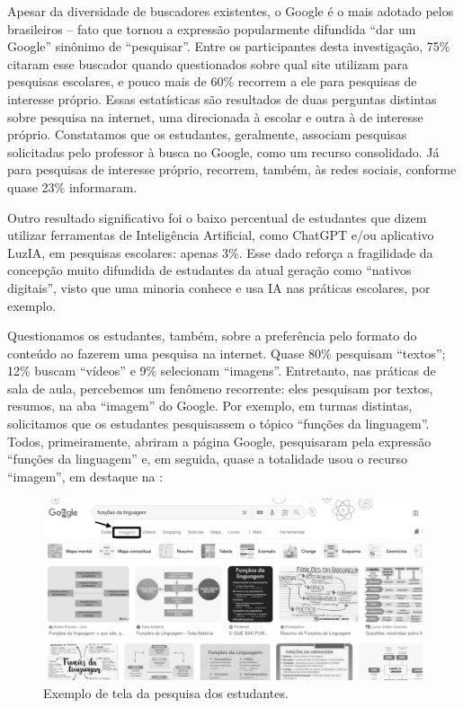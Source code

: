 \documentclass[portuguese]{textolivre}
\begin{document}
Apesar da diversidade de buscadores existentes, o Google é o mais adotado pelos brasileiros – fato que tornou a expressão popularmente difundida ``dar um Google'' sinônimo de ``pesquisar''. Entre os participantes desta investigação, 75\% citaram esse buscador quando questionados sobre qual site utilizam para pesquisas escolares, e pouco mais de 60\% recorrem a ele para pesquisas de interesse próprio. Essas estatísticas são resultados de duas perguntas distintas sobre pesquisa na internet, uma direcionada à escolar e outra à de interesse próprio. Constatamos que os estudantes, geralmente, associam pesquisas solicitadas pelo professor à busca no Google, como um recurso consolidado. Já para pesquisas de interesse próprio, recorrem, também, às redes sociais, conforme quase 23\% informaram.

Outro resultado significativo foi o baixo percentual de estudantes que dizem utilizar ferramentas de Inteligência Artificial, como ChatGPT e/ou aplicativo LuzIA, em pesquisas escolares: apenas 3\%. Esse dado reforça a fragilidade da concepção muito difundida de estudantes da atual geração como ``nativos digitais'', visto que uma minoria conhece e usa IA nas práticas escolares, por exemplo.

Questionamos os estudantes, também, sobre a preferência pelo formato do conteúdo ao fazerem uma pesquisa na internet. Quase 80\% pesquisam ``textos''; 12\% buscam ``vídeos'' e 9\% selecionam ``imagens''. Entretanto, nas práticas de sala de aula, percebemos um fenômeno recorrente: eles pesquisam por textos, resumos, na aba ``imagem'' do Google. Por exemplo, em turmas distintas, solicitamos que os estudantes pesquisassem o tópico ``funções da linguagem''. Todos, primeiramente, abriram a página Google, pesquisaram pela expressão ``funções da linguagem'' e, em seguida, quase a totalidade usou o recurso ``imagem'', em destaque na :

\begin{figure}
\centering
\begin{minipage}{\linewidth}
\includegraphics[width=\linewidth]{Fig1.png}
\caption{Exemplo de tela da pesquisa dos estudantes.}
\label{fig3}
\end{minipage}
\end{figure}
\end{document}
